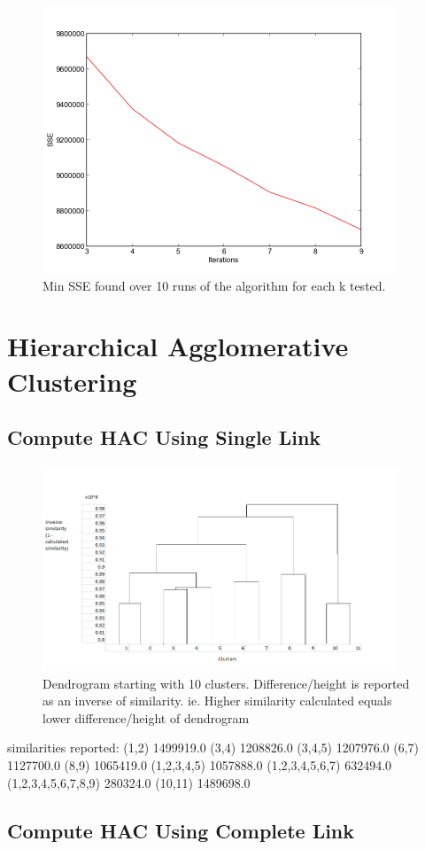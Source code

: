 \documentclass[letterpaper,10pt]{article}
\begin{document}
     \begin{figure}[ht]
    \centering
   \includegraphics[width=300pt]{diffks.png}
    \caption{Min SSE found over 10 runs of the algorithm for each k tested.}
    \label{fig:diffk}
    \end{figure}	


\section{Hierarchical Agglomerative Clustering}
\subsection{Compute HAC Using Single Link}
     \begin{figure}[ht]
    \centering
   \includegraphics[width=300pt]{dendroHAC.png}
    \caption{Dendrogram starting with 10 clusters. Difference/height is reported as an inverse of similarity. ie. Higher similarity calculated equals lower difference/height of dendrogram}
    \label{fig:diffk}
    \end{figure}	

	similarities reported: 
	(1,2) 1499919.0
	(3,4) 1208826.0
	(3,4,5) 1207976.0
	(6,7) 1127700.0
	(8,9) 1065419.0
	(1,2,3,4,5) 1057888.0
	(1,2,3,4,5,6,7) 632494.0
	(1,2,3,4,5,6,7,8,9) 280324.0
	(10,11) 1489698.0

\subsection{Compute HAC Using Complete Link}
\end{document}
